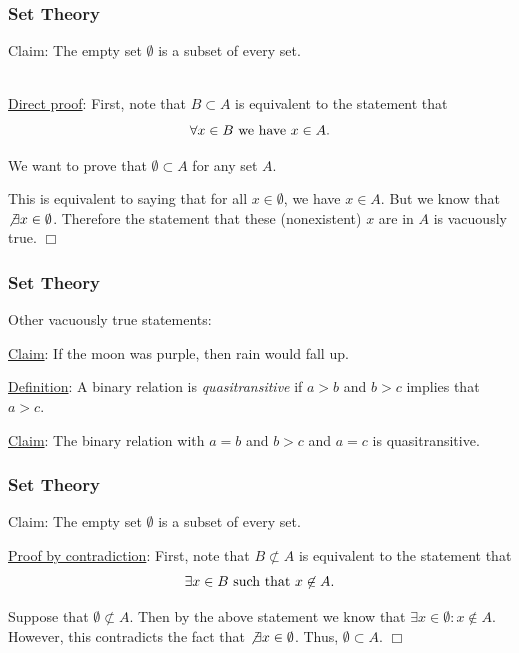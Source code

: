 \documentclass[aspectratio=169]{beamer}
\numberwithin{equation}{section}
\begin{document}
\begin{frame}
\frametitle{Set Theory}

Claim:  The empty set $\emptyset$ is a subset of every set. \pause

\ \\\underline{Direct proof}: First, note that $B\subset A$ is equivalent to the statement that $$\forall x\in B \hbox{ we have }  x\in A.$$ \pause

We want to prove that $\emptyset \subset A$ for any set $A$. \pause

This is equivalent to saying that for all $x\in \emptyset$, we have $ x\in A$.  But we know that $\not\exists x\in \emptyset$.  Therefore the statement that these (nonexistent) $x$ are in $A$ is vacuously true.  $\Box$

\end{frame}



\begin{frame}
\frametitle{Set Theory}

Other vacuously true statements: \pause

\underline{Claim}: If the moon was purple, then rain would fall up.

\underline{Definition}: A binary relation is \textit{quasitransitive} if $a>b$ and $b>c$ implies that $a>c$.

\underline{Claim}: The binary relation with $a=b$ and $b>c$ and $a=c$ is quasitransitive.

\end{frame}



\begin{frame}
\frametitle{Set Theory}

Claim:  The empty set $\emptyset$ is a subset of every set. \pause

\underline{Proof by contradiction}: First, note that $B\not\subset A$ is equivalent to the statement that $$\exists x\in B \hbox{ such that } x\not\in A. $$ \pause

Suppose that $\emptyset \not\subset A$.  \pause Then by the above statement we know that $\exists x\in \emptyset: x\not\in A$.  However, this contradicts the fact that $\not\exists x\in \emptyset$.  Thus, $\emptyset\subset A$.   $\Box$

\end{frame}
\end{document}
